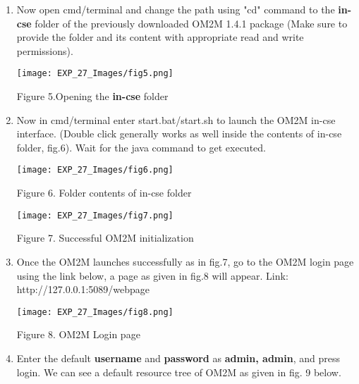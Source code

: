 \documentclass[12pt,a4paper]{article}
\begin{document}
\begin{justify}
\begin{enumerate}
\item  Now open cmd/terminal and change the path using "cd" command to the \textbf{in-cse} folder of the previously downloaded OM2M 1.4.1 package (Make sure to provide the folder and its content with appropriate read and write permissions).

\begin{center} 
\texttt{[image: EXP\_27\_Images/fig5.png]}
\end{center}
\vspace{-9mm}
\begin{center} {Figure 5.Opening the \textbf{in-cse} folder}\end{center}  

\item  Now in cmd/terminal enter start.bat/start.sh to launch the OM2M in-cse interface. (Double click generally works as well inside the contents of in-cse folder, fig.6). Wait for the java command to get executed.

\begin{center} 
\texttt{[image: EXP\_27\_Images/fig6.png]}
\end{center}
\vspace{-9mm}
\begin{center} {Figure 6. Folder contents of in-cse folder}\end{center}  

\begin{center} 
\texttt{[image: EXP\_27\_Images/fig7.png]}
\end{center}
\vspace{-9mm}
\begin{center} {Figure 7. Successful OM2M initialization}\end{center}  

\item Once the OM2M launches successfully as in fig.7, go to the OM2M login page using the link below, a page as given in fig.8 will appear. Link:  http://127.0.0.1:5089/webpage 

\begin{center} 
\texttt{[image: EXP\_27\_Images/fig8.png]}
\end{center}
\vspace{-9mm}
\begin{center} {Figure 8. OM2M Login page}\end{center}  

\item Enter the default \textbf {username} and \textbf {password} as \textbf{admin, admin}, and press login. We can see a default resource tree of OM2M as given in fig. 9 below.


\end{enumerate}
\end{justify}
\end{document}
